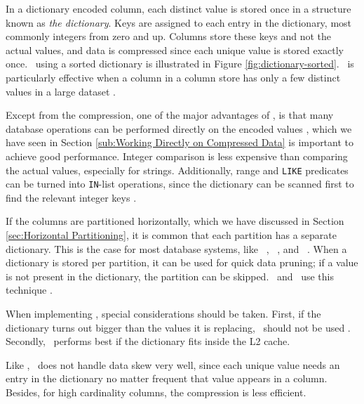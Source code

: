 
In a dictionary encoded column, each distinct value is stored once in a structure known as \textit{the dictionary}. Keys are assigned to each entry in the dictionary, most commonly integers from zero and up. Columns store these keys and not the actual values, and data is compressed since each unique value is stored exactly once. \de~using a sorted dictionary is illustrated in Figure \ref{fig:dictionary-sorted}. \de~is particularly effective when a column in a column store has only a few distinct values in a large dataset \cite{Faust2015-ke}.


Except from the compression, one of the major advantages of \de, is that many database operations can be performed directly on the encoded values \cite{Faust2015-ke}, which we have seen in Section \ref{sub:Working Directly on Compressed Data} is important to achieve good performance. Integer comparison is less expensive than comparing the actual values, especially for strings. Additionally, range and \texttt{LIKE} predicates can be turned into \texttt{IN}-list operations, since the dictionary can be scanned first to find the relevant integer keys \cite{Barber2012-xt}.

If the columns are partitioned horizontally, which we have discussed in Section \ref{sec:Horizontal Partitioning}, it is common that each partition has a separate dictionary. This is the case for most database systems, like \oracle~\cite{Lahiri2015-mz}, \blink~\cite{Barber2012-xt}, and \mssql~\cite{Larson2013-mc}. When a dictionary is stored per partition, it can be used for quick data pruning; if a value is not present in the dictionary, the partition can be skipped. \blink~and \monetx~use this technique \cite{Barber2012-xt, Boncz2005-wj}. 

When implementing \de, special considerations should be taken. First, if the dictionary turns out bigger than the values it is replacing, \de~should not be used \cite{Holloway2008-rr}. Secondly, \de~performs best if the dictionary fits inside the L2 cache.

Like \bp, \de~does not handle data skew very well, since each unique value needs an entry in the dictionary no matter frequent that value appears in a column. Besides, for high cardinality columns, the compression is less efficient.

